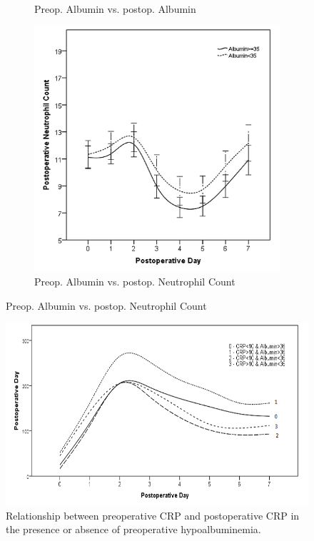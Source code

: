 \begin{figure}[p]
\begin{subfigure}{0.48\textwidth}
		\caption{Preop. Albumin vs. postop. Albumin}
		\label{fig:sirs_alb_alb}
	\end{subfigure}
	
	\vspace{1cm}
	
	\begin{subfigure}{0.48\textwidth}
		\centering
		\includegraphics[width=\textwidth]{Figures/sirs_alb_neut}
		\caption{Preop. Albumin vs. postop. Neutrophil Count}
		\label{fig:sirs_alb_neut}
	\end{subfigure}	
\end{figure}

\clearpage
\begin{figure}[t]
	\centering
	\includegraphics[width=\textwidth]{Figures/sirs_crp_crp_alb}
	\caption{Relationship between preoperative CRP and postoperative CRP in the presence or absence of preoperative hypoalbuminemia.}
	\label{fig:sirs_crp_crp_alb}
\end{figure}

\clearpage

